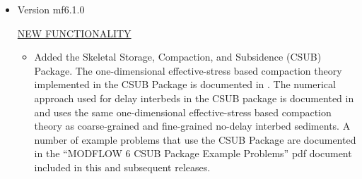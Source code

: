 \begin{itemize}
	\item Version mf6.1.0
	
	\underline{NEW FUNCTIONALITY}
	\begin{itemize}
		\item Added the Skeletal Storage, Compaction, and Subsidence (CSUB) Package. The one-dimensional effective-stress based compaction theory implemented in the CSUB Package is documented in \cite{leake2007modflow}. The numerical approach used for delay interbeds in the CSUB package is documented in \cite{hoffmann2003modflow} and uses the same one-dimensional effective-stress based compaction theory as coarse-grained and fine-grained no-delay interbed sediments. A number of example problems that use the CSUB Package are documented in the ``MODFLOW 6 CSUB Package Example Problems'' pdf document included in this and subsequent releases.
	\end{itemize}
	

\end{itemize}
